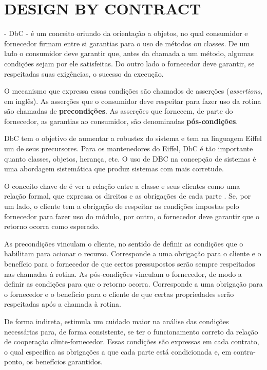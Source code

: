 \section{DESIGN BY CONTRACT}
\label{Design-by-Contract}
\vspace{-6mm}

\designbycontract{} \cite{meyer1992applying} - DbC - é um conceito
oriundo da orientação a objetos, no qual consumidor e fornecedor firmam entre si garantias para
o uso de métodos ou classes. De um lado o consumidor deve garantir que, antes da
chamada a um método, algumas condições sejam por ele satisfeitas.
Do outro lado o fornecedor deve garantir, se respeitadas suas exigências,
o sucesso da execução.

O mecanismo que expressa essas condições são chamados de asserções
(\textit{assertions}, em inglês). As asserções que o consumidor deve respeitar
para fazer uso da rotina são chamadas de \textbf{precondições}. As asserções que
fornecem, de parte do fornecedor, as garantias ao consumidor, são denominadas
\textbf{pós-condições}.

DbC tem o objetivo de aumentar a robustez do sistema e tem na linguagem Eiffel
\cite{meyer1988eiffel} um de seus precursores. Para os mantenedores do Eiffel, DbC é
tão importante quanto classes, objetos, herança, etc. O uso de DBC na
concepção de sistemas é uma abordagem sistemática que produz sistemas com mais
corretude.

O conceito chave de \designbycontract{} é ver a relação entre a classe e
seus clientes como uma relação formal, que expressa os direitos e as
obrigações de cada parte \cite{meyer1997object}. Se, por um lado, o
cliente tem a obrigação de respeitar as condições impostas pelo fornecedor para fazer uso do módulo, por
outro, o fornecedor deve garantir que o retorno ocorra como esperado.

As precondições vinculam o cliente, no sentido de definir as condições que
o habilitam para acionar o recurso. Corresponde a uma obrigação para o cliente e
o benefício para o fornecedor \cite{meyer1997object} de que certos
pressupostos serão sempre respeitados nas chamadas à rotina.
As pós-condições vinculam o fornecedor, de modo a definir as condições para que o retorno ocorra.
Corresponde a uma obrigação para o fornecedor e o benefício para o cliente de
que certas propriedades serão respeitadas após a chamada à rotina.

De forma indireta, \designbycontract{} estimula um cuidado maior na análise das
condições necessárias para, de forma consistente, se ter o funcionamento correto
da relação de cooperação clinte-fornecedor.
Essas condições são expressas em cada contrato, o qual especifica as obrigações
a que cada parte está condicionada e, em contra-ponto, os benefícios garantidos.

